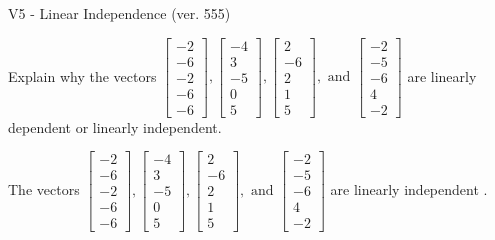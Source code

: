\begin{exercise}
  \begin{exerciseTitle}V5 - Linear Independence (ver. 555)\end{exerciseTitle}
  \begin{exerciseStatement}
    Explain why the vectors \(\left[\begin{array}{r}
-2 \\
-6 \\
-2 \\
-6 \\
-6
\end{array}\right] , \left[\begin{array}{r}
-4 \\
3 \\
-5 \\
0 \\
5
\end{array}\right] , \left[\begin{array}{r}
2 \\
-6 \\
2 \\
1 \\
5
\end{array}\right] , \text{ and } \left[\begin{array}{r}
-2 \\
-5 \\
-6 \\
4 \\
-2
\end{array}\right]\) are linearly dependent or linearly independent.	


  \end{exerciseStatement}
  \begin{exerciseAnswer}
   The vectors \(\left[\begin{array}{r}
-2 \\
-6 \\
-2 \\
-6 \\
-6
\end{array}\right] , \left[\begin{array}{r}
-4 \\
3 \\
-5 \\
0 \\
5
\end{array}\right] , \left[\begin{array}{r}
2 \\
-6 \\
2 \\
1 \\
5
\end{array}\right] , \text{ and } \left[\begin{array}{r}
-2 \\
-5 \\
-6 \\
4 \\
-2
\end{array}\right]\) are 
  	 linearly independent  .
  


  \end{exerciseAnswer}
\end{exercise}